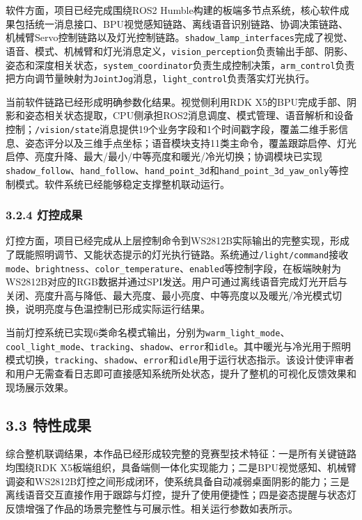 \documentclass[UTF8,a4paper,zihao=-4]{ctexart}
\begin{document}
软件方面，项目已经完成围绕ROS2 Humble构建的板端多节点系统，核心软件成果包括统一消息接口、BPU视觉感知链路、离线语音识别链路、协调决策链路、机械臂Servo控制链路以及灯光控制链路。\texttt{shadow\_lamp\_interfaces}完成了视觉、语音、模式、机械臂和灯光消息定义，\texttt{vision\_perception}负责输出手部、阴影、姿态和深度相关状态，\texttt{system\_coordinator}负责生成控制决策，\texttt{arm\_control}负责把方向调节量映射为\texttt{JointJog}消息，\texttt{light\_control}负责落实灯光执行。

当前软件链路已经形成明确参数化结果。视觉侧利用RDK X5的BPU完成手部、阴影和姿态相关状态提取，CPU侧承担ROS2消息调度、模式管理、语音解析和设备控制；\texttt{/vision/state}消息提供19个业务字段和1个时间戳字段，覆盖二维手影信息、姿态评分以及三维手点坐标；语音模块支持11类主命令，覆盖跟踪启停、灯光启停、亮度升降、最大/最小/中等亮度和暖光/冷光切换；协调模块已实现\texttt{shadow\_follow}、\texttt{hand\_follow}、\texttt{hand\_point\_3d}和\texttt{hand\_point\_3d\_yaw\_only}等控制模式。软件系统已经能够稳定支撑整机联动运行。

\subsubsection*{3.2.4 灯控成果}

灯控方面，项目已经完成从上层控制命令到WS2812B实际输出的完整实现，形成了既能照明调节、又能状态提示的灯光执行链路。系统通过\texttt{/light/command}接收\texttt{mode}、\texttt{brightness}、\texttt{color\_temperature}、\texttt{enabled}等控制字段，在板端映射为WS2812B对应的RGB数据并通过SPI发送。用户可通过离线语音完成灯光开启与关闭、亮度升高与降低、最大亮度、最小亮度、中等亮度以及暖光/冷光模式切换，说明亮度与色温控制已形成实际运行结果。

当前灯控系统已实现6类命名模式输出，分别为\texttt{warm\_light\_mode}、\texttt{cool\_light\_mode}、\texttt{tracking}、\texttt{shadow}、\texttt{error}和\texttt{idle}。其中暖光与冷光用于照明模式切换，\texttt{tracking}、\texttt{shadow}、\texttt{error}和\texttt{idle}用于运行状态指示。该设计使评审者和用户无需查看日志即可直接感知系统所处状态，提升了整机的可视化反馈效果和现场展示效果。

\subsection*{3.3 特性成果}

综合整机联调结果，本作品已经形成较完整的竞赛型技术特征：一是所有关键链路均围绕RDK X5板端组织，具备端侧一体化实现能力；二是BPU视觉感知、机械臂调姿和WS2812B灯控之间形成闭环，使系统具备自动减弱桌面阴影的能力；三是离线语音交互直接作用于跟踪与灯控，提升了使用便捷性；四是姿态提醒与状态灯反馈增强了作品的场景完整性与可展示性。相关运行参数如表所示。
\end{document}

